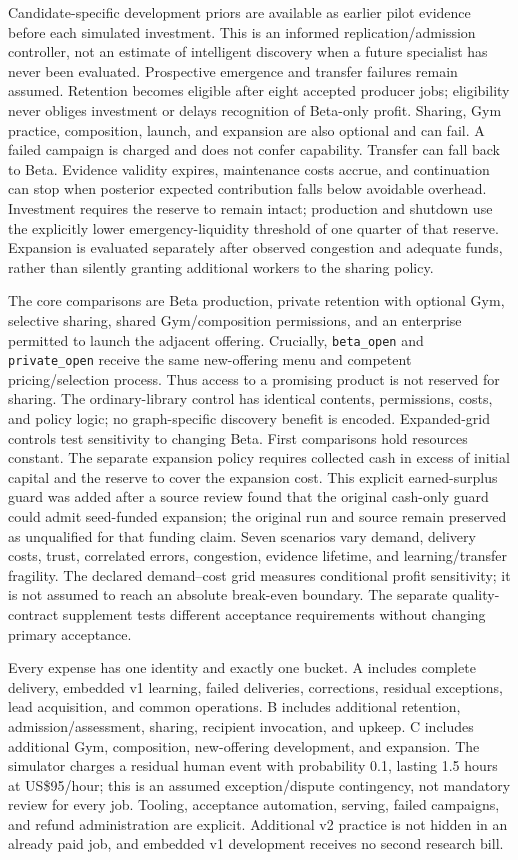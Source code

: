 Candidate-specific development priors are available as earlier pilot evidence before each simulated investment. This is an informed replication/admission controller, not an estimate of intelligent discovery when a future specialist has never been evaluated. Prospective emergence and transfer failures remain assumed. Retention becomes eligible after eight accepted producer jobs; eligibility never obliges investment or delays recognition of Beta-only profit. Sharing, Gym practice, composition, launch, and expansion are also optional and can fail. A failed campaign is charged and does not confer capability. Transfer can fall back to Beta. Evidence validity expires, maintenance costs accrue, and continuation can stop when posterior expected contribution falls below avoidable overhead. Investment requires the reserve to remain intact; production and shutdown use the explicitly lower emergency-liquidity threshold of one quarter of that reserve. Expansion is evaluated separately after observed congestion and adequate funds, rather than silently granting additional workers to the sharing policy.

The core comparisons are Beta production, private retention with optional Gym, selective sharing, shared Gym/composition permissions, and an enterprise permitted to launch the adjacent offering. Crucially, \texttt{beta\_open} and \texttt{private\_open} receive the same new-offering menu and competent pricing/selection process. Thus access to a promising product is not reserved for sharing. The ordinary-library control has identical contents, permissions, costs, and policy logic; no graph-specific discovery benefit is encoded. Expanded-grid controls test sensitivity to changing Beta. First comparisons hold resources constant. The separate expansion policy requires collected cash in excess of initial capital and the reserve to cover the expansion cost. This explicit earned-surplus guard was added after a source review found that the original cash-only guard could admit seed-funded expansion; the original run and source remain preserved as unqualified for that funding claim. Seven scenarios vary demand, delivery costs, trust, correlated errors, congestion, evidence lifetime, and learning/transfer fragility. The declared demand--cost grid measures conditional profit sensitivity; it is not assumed to reach an absolute break-even boundary. The separate quality-contract supplement tests different acceptance requirements without changing primary acceptance.

Every expense has one identity and exactly one bucket. A includes complete delivery, embedded v1 learning, failed deliveries, corrections, residual exceptions, lead acquisition, and common operations. B includes additional retention, admission/assessment, sharing, recipient invocation, and upkeep. C includes additional Gym, composition, new-offering development, and expansion. The simulator charges a residual human event with probability 0.1, lasting 1.5 hours at US\$95/hour; this is an assumed exception/dispute contingency, not mandatory review for every job. Tooling, acceptance automation, serving, failed campaigns, and refund administration are explicit. Additional v2 practice is not hidden in an already paid job, and embedded v1 development receives no second research bill.

